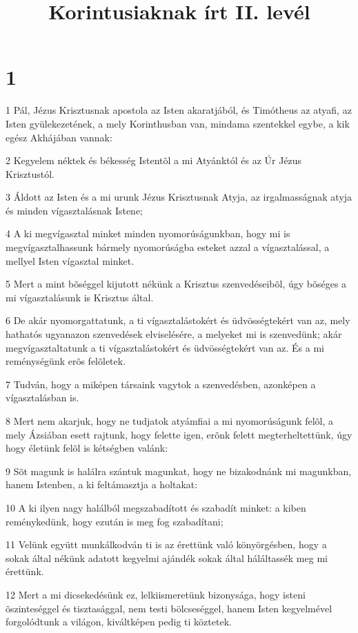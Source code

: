 

\title{Korintusiaknak írt II. levél}


\chapter{1}

\par 1 Pál, Jézus Krisztusnak apostola az Isten akaratjából, és Timótheus az atyafi, az Isten gyülekezetének, a mely Korinthusban van, mindama szentekkel egybe, a kik egész Akhájában vannak:
\par 2 Kegyelem néktek és békesség Istentõl a mi Atyánktól és az Úr Jézus Krisztustól.
\par 3 Áldott az Isten és a mi urunk Jézus Krisztusnak Atyja, az irgalmasságnak atyja és minden  vígasztalásnak Istene;
\par 4 A ki megvígasztal minket minden nyomorúságunkban, hogy mi is megvígasztalhassunk bármely nyomorúságba esteket azzal a vígasztalással, a mellyel Isten vígasztal minket.
\par 5 Mert a mint bõséggel kijutott nékünk a Krisztus szenvedéseibõl,  úgy bõséges a mi vígasztalásunk is Krisztus által.
\par 6 De akár nyomorgattatunk, a ti vígasztalástokért és üdvösségtekért van az, mely hathatós ugyanazon szenvedések elviselésére, a melyeket mi is szenvedünk; akár megvígasztaltatunk a ti vígasztalástokért és üdvösségtekért van az. És a mi reménységünk erõs felõletek.
\par 7 Tudván, hogy a miképen társaink vagytok a szenvedésben, azonképen a vígasztalásban is.
\par 8 Mert nem akarjuk, hogy ne tudjatok atyámfiai a mi nyomorúságunk felõl, a mely Ázsiában esett rajtunk, hogy felette igen, erõnk felett megterheltettünk, úgy hogy életünk felõl is kétségben valánk:
\par 9 Sõt magunk is halálra szántuk magunkat, hogy ne bizakodnánk mi magunkban, hanem Istenben, a ki feltámasztja a holtakat:
\par 10 A ki ilyen nagy halálból megszabadított és szabadít minket: a kiben reménykedünk, hogy ezután is meg fog szabadítani;
\par 11 Velünk együtt munkálkodván ti is az érettünk való könyörgésben, hogy a sokak által nékünk adatott kegyelmi ajándék sokak által háláltassék meg mi érettünk.
\par 12 Mert a mi dicsekedésünk ez, lelkiismeretünk bizonysága, hogy isteni õszinteséggel  és tisztasággal, nem testi bölcseséggel, hanem Isten kegyelmével forgolódtunk a világon, kiváltképen pedig ti köztetek.
